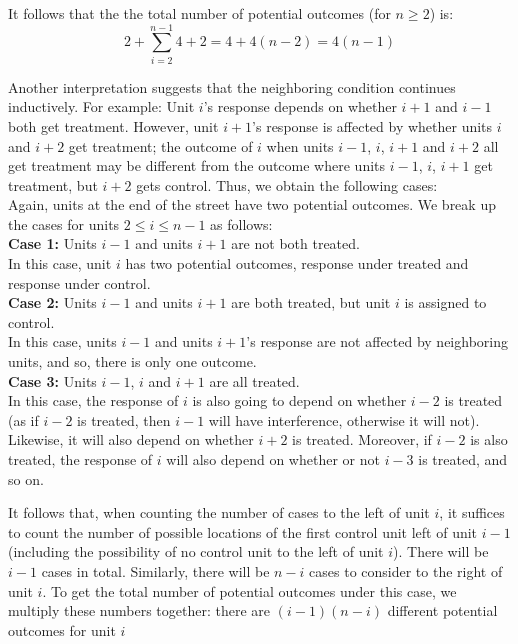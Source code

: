 \documentclass{article}
\begin{document}
\begin{itemize}
\begin{itemize}
    It follows that the the total number of potential outcomes (for $n \geq 2$) is:
    $$
      2 + \sum_{i = 2}^{n-1} 4 + 2 = 4 + 4(n-2) = 4(n-1)
    $$ 
    
    Another interpretation suggests that the neighboring condition continues inductively.
    For example:  Unit $i$'s response depends on whether $i +1$ and $i-1$ both get treatment.
    However, unit $i+1$'s response is affected by whether units $i$ and $i+2$ get treatment;
    the outcome of $i$ when units $i-1$, $i$, $i+1$ and $i+2$ all get treatment may be different from 
    the outcome where units $i-1$, $i$, $i+1$ get treatment, but $i+2$ gets control.
    Thus, we obtain the following cases:\\
    
    Again, units at the end of the street have two potential outcomes.
    We break up the cases for units $2 \leq i \leq n-1$ as follows:\\
    \textbf{Case 1:}
      Units $i-1$ and units $i + 1$ are not both treated.\\
      In this case, unit $i$ has two potential outcomes, 
      response under treated and response under control.\\
    \textbf{Case 2:}
      Units $i-1$ and units $i + 1$ are both treated, 
      but unit $i$ is assigned to control. \\
      In this case, units $i-1$ and units $i+1$'s response are not affected 
      by neighboring units, and so, there is only one outcome.\\
    \textbf{Case 3:} 
      Units $i-1$, $i$ and $i+1$ are all treated.\\
      In this case, the response of $i$ is also going 
      to depend on whether $i-2$ is treated 
      (as if $i-2$ is treated, then $i-1$ will have interference, otherwise it will not). 
      Likewise, it will also depend on whether $i+2$ is treated.
      Moreover, if $i-2$ is also treated, the response of $i$ 
      will also depend on whether or not $i-3$ is treated, and so on.
      
      It follows that, when counting the number of cases to the left of unit $i$, 
      it suffices to count the number of possible locations of the first control unit left of 
      unit $i-1$ (including the possibility of no control unit to the left of unit $i$).
      There will be $i-1$ cases in total.
      Similarly, there will be $n-i$ cases to consider to the right of unit $i$.
      To get the total number of potential outcomes under this case, we multiply these
      numbers together: there are $(i-1)(n-i)$ different potential outcomes for unit $i$
      

\end{itemize}
\end{itemize}
\end{document}
